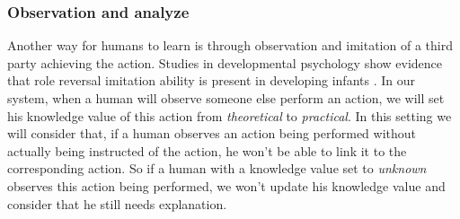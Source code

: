\documentclass{llncs}
\begin{document}
\subsubsection{Observation and analyze}
%
Another way for humans to learn is through observation and imitation of a third party achieving the action. Studies in developmental psychology show evidence that role reversal imitation ability is present in developing infants \cite{carpenter2005}.
In our system, when a human will observe someone else perform an action, we will set his knowledge value of this action from \textit{theoretical} to \textit{practical}. In this setting we will consider that, if a human observes an action being performed without actually being instructed of the action, he won't be able to link it to the corresponding action. So if a human with a knowledge value set to \textit{unknown} observes this action being performed, we won't update his knowledge value and consider that he still needs explanation.







\end{document}
